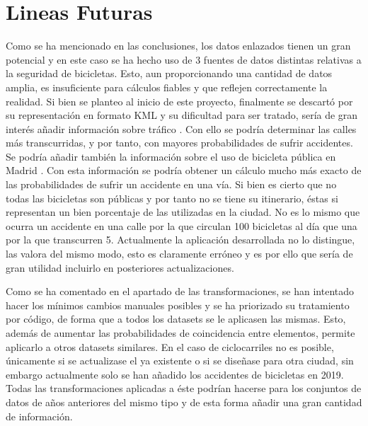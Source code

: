 \chapter{Lineas Futuras}

Como se ha mencionado en las conclusiones, los datos enlazados tienen un gran potencial y en este caso se ha hecho uso de 3 fuentes de datos distintas relativas a la seguridad de bicicletas. Esto, aun proporcionando una cantidad de datos amplia, es insuficiente para cálculos fiables y que reflejen correctamente la realidad. Si bien se planteo al inicio de este proyecto, finalmente se descartó por su representación en formato KML y su dificultad para ser tratado, sería de gran interés añadir información sobre tráfico \cite{datos_madrid_trafico}. Con ello se podría determinar las calles más transcurridas, y por tanto, con mayores probabilidades de sufrir accidentes. Se podría añadir también la información sobre el uso de bicicleta pública en Madrid \cite{datosMadrid_rutas_bici}. Con esta información se podría obtener un cálculo mucho más exacto de las probabilidades de sufrir un accidente en una vía. Si bien es cierto que no todas las bicicletas son públicas y por tanto no se tiene su itinerario, éstas si representan un bien porcentaje de las utilizadas en la ciudad. No es lo mismo que ocurra un accidente en una calle por la que circulan 100 bicicletas al día que una por la que transcurren 5. Actualmente la aplicación desarrollada no lo distingue, las valora del mismo modo, esto es claramente erróneo y es por ello que sería de gran utilidad incluirlo en posteriores actualizaciones.

Como se ha comentado en el apartado de las transformaciones, se han intentado hacer los mínimos cambios manuales posibles y se ha priorizado su tratamiento por código, de forma que a todos los datasets se le aplicasen las mismas. Esto, además de aumentar las probabilidades de coincidencia entre elementos, permite aplicarlo a otros datasets similares. En el caso de ciclocarriles no es posible, únicamente si se actualizase el ya existente o si se diseñase para otra ciudad, sin embargo actualmente solo se han añadido los accidentes de bicicletas en 2019. Todas las transformaciones aplicadas a éste podrían hacerse para los conjuntos de datos de años anteriores del mismo tipo \cite{datosMadrid_accidentesDeBicicleta} y de esta forma añadir una gran cantidad de información.

